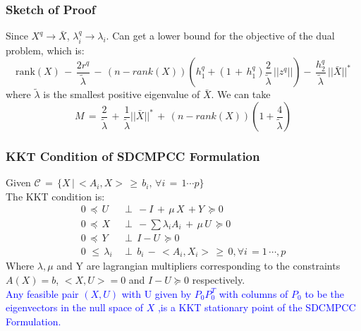 \documentclass{beamer}
\newcommand{\tblue}{\textcolor{blue}}
\begin{document}
\begin{frame}
\frametitle{Sketch of Proof}
Since $X^q\rightarrow \bar{X}$, $\lambda_i^q\rightarrow\lambda_i$. Can get a lower bound for the objective of the dual problem, which is:
\begin{displaymath}
\mbox{rank}(X)\,-\,\frac{2r^q}{\tilde{\lambda}}\,-\,(n-rank(X))(h_1^q+(1\,+\,h_1^q)\frac{2}{\tilde{\lambda}}\,||z^q||)-\,\frac{h_2^q}{\tilde{\lambda}}\,||\bar{X}||^*
\end{displaymath}
where $\tilde{\lambda}$ is the smallest positive eigenvalue of $\bar{X}$.
\bigskip
We can take 
\begin{displaymath}
M\,=\,\frac{2}{\tilde{\lambda}}\,+\,\frac{1}{\tilde{\lambda}}||\bar{X}||^*\,+\,(n-rank(X))(1+\frac{4}{\tilde{\lambda}})
\end{displaymath}
\end{frame}

\begin{frame}
\frametitle{KKT Condition of SDCMPCC Formulation}
Given $\mathcal{C}\,=\,\{X\,|\,<A_i, X>\, \geq \, b_i, \, \forall i\,=\,1\cdots p\}$\\
The KKT condition is:
\begin{equation}\label{ExactKKTCondition}
\begin{array}{ll}
0\,\preceq\,U&\,\perp\,-I\,+\,\mu\, X\,+Y\,\succeq 0 \\[0.15in]
0\,\preceq\,X&\,\perp\,-\sum\lambda_i A_i\,+\,\mu\, U\,\succeq 0 \\[0.15in]
0\,\preceq\,Y&\,\perp\,I- U\,\succeq 0\\[0.15in]
0\,\,\leq\,\lambda_i&\,\perp\,b_i\,-\,<A_i, X_i>\,\geq\,0, \forall i\,=1\,\cdots,p
\end{array}
\end{equation}
Where $\lambda, \mu$ and Y are lagrangian multipliers corresponding to the constraints $A(X)=b$, $<X,U>=0$ and $I-U\succeq 0$ respectively.\\
\bigskip
\tblue{Any feasible pair $(X, U)$ with U given by $P_0 P_0^T$ with columns of $P_0$ to be the eigenvectors in the null space of $X$ ,is a KKT stationary point of the SDCMPCC Formulation.}

%

\end{frame}
\end{document}
